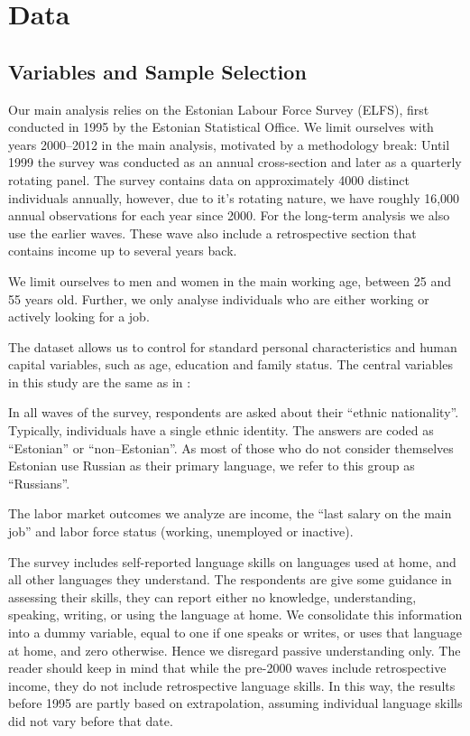 \documentclass[12pt, a4paper]{article}
\begin{document}
\section{Data}
\label{subsec:ss_var}

\subsection{Variables and Sample Selection}
\label{sec:variables}

Our main analysis relies on the Estonian Labour Force Survey (ELFS),
first conducted in 1995 by the Estonian Statistical Office.  We limit
ourselves with years 2000--2012 in the main analysis, motivated by a
methodology break: Until 1999 the survey was conducted as an annual
cross-section and later as a quarterly rotating panel.  The survey
contains data on approximately 4000 distinct individuals annually,
however, due to it's rotating nature, we have roughly 16,000 annual
observations for each year since 2000.  For the long-term analysis we
also use the earlier waves.  These wave also include a retrospective
section that contains income up to several years back.

We limit ourselves to men and women in the main working age, between 25 and
55 years old.  Further, we only analyse
individuals who are either working or actively looking for a job.

The dataset allows us to control for standard personal
characteristics and human capital variables, such as age, education
and family status.  The central variables in this study are the same
as in \citep{Leping2008}:

In all waves of the survey, respondents are asked about their
``ethnic nationality''.  Typically, individuals have a single ethnic
identity.  The answers are coded as ``Estonian'' or
``non--Estonian''.  As most of those who do not consider themselves
Estonian use Russian as their primary language, we refer to this group
as ``Russians''.

The labor market outcomes we analyze are income, the ``last salary on the main job'' and
labor force status (working, unemployed or inactive).  

The survey includes self-reported language skills on languages used at
home, and all other languages they understand.  The respondents are
give some guidance in assessing their skills, they can report either
no knowledge, understanding, speaking, writing, or using the
language at home.  We consolidate this information into a dummy variable, equal
to one if one speaks or writes, or uses that language at
home, and zero otherwise.  Hence we disregard passive understanding
only.
  The reader should keep in mind that while the pre-2000 waves include retrospective income, they do not include retrospective language skills. In this way, the results before
1995 are partly based on extrapolation, assuming individual language
skills did not vary before that date.
\end{document}
